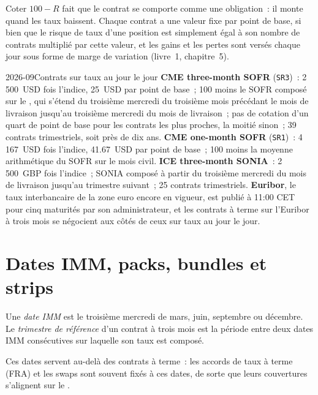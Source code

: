 Coter $100 - R$ fait que le contrat se comporte comme une obligation~: il monte quand les taux
baissent. Chaque contrat a une valeur fixe par point de base, si bien que le
risque de taux d'une position est simplement égal à son nombre de contrats multiplié par cette valeur, et
les gains et les pertes sont versés chaque jour sous forme de marge de variation (livre~1,
chapitre~5).

\begin{dated}{2026-09}{Contrats sur taux au jour le jour}\label{dat:m2:short-term-interest-rate-futures:contracts}
\textbf{CME three-month SOFR} (\texttt{SR3})~: 2\,500~USD fois l'indice, 25~USD par
point de base~; 100 moins le SOFR composé sur le , qui s'étend
du troisième mercredi du troisième mois précédant le mois de livraison jusqu'au
troisième mercredi du mois de livraison~; pas de cotation d'un quart de point de base pour les
contrats les plus proches, la moitié sinon~; 39 contrats trimestriels, soit près de dix ans.
\textbf{CME one-month SOFR} (\texttt{SR1})~: 4\,167~USD fois l'indice, 41.67~USD par
point de base~; 100 moins la moyenne arithmétique du SOFR sur le mois civil.
\textbf{ICE three-month SONIA}~: 2\,500~GBP fois l'indice~; SONIA composé à partir du
troisième mercredi du mois de livraison jusqu'au trimestre suivant~; 25
contrats trimestriels. \textbf{Euribor}, le taux interbancaire de la zone euro encore en vigueur,
est publié à 11:00 CET pour cinq maturités par son administrateur, et les contrats à terme
sur l'Euribor à trois mois se négocient aux côtés de ceux sur taux au jour le jour.
\end{dated}

\section{Dates IMM, packs, bundles et strips}

\begin{definition}\label{def:m2:short-term-interest-rate-futures:imm}
Une \emph{date IMM} est le troisième mercredi de mars, juin,
septembre ou décembre. Le \emph{trimestre
de référence} d'un contrat à trois mois est la période entre deux
dates IMM consécutives sur laquelle son taux est composé.
\end{definition}

Ces dates servent au-delà des contrats à terme~: les accords de taux à terme (FRA) et les swaps sont
souvent fixés à ces dates, de sorte que leurs couvertures s'alignent sur le .


